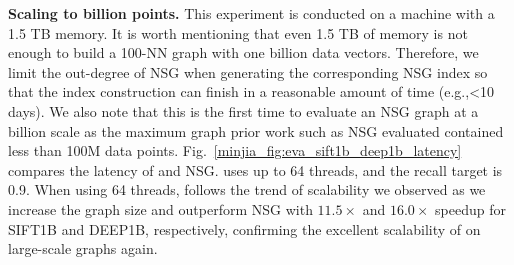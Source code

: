\textbf{Scaling to billion points.}
This experiment is conducted on a machine with a 1.5 TB memory.
It is worth mentioning that even 1.5 TB of memory is not enough to build a 100-NN graph with one billion data vectors. Therefore, we limit the out-degree of NSG
when generating the corresponding NSG index so that the index construction can finish in a reasonable amount of time (e.g.,<10 days). We also note that this is the first time to evaluate an NSG graph at a billion scale as the maximum graph prior work such as NSG evaluated contained less than 100M data points. Fig.~\ref{minjia_fig:eva_sift1b_deep1b_latency} compares the latency of \Hammer and NSG. \Hammer uses up to 64 threads, and the recall target is 0.9. 
When using 64 threads, \Hammer follows the trend of scalability we observed as we increase the graph size and outperform NSG with $11.5\times$ and $16.0\times$ speedup for SIFT1B and DEEP1B, respectively, confirming the excellent scalability of \Hammer on large-scale graphs again. 






